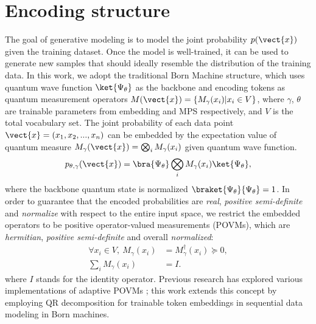 \section{Encoding structure}

The goal of generative modeling is to model the joint probability $p(\vect{x})$ given the training dataset. Once the model is well-trained, it can be used to generate new samples that should ideally resemble the distribution of the training data. In this work, we adopt the traditional Born Machine structure, which uses quantum wave function $\ket{\Psi_\theta}$ as the backbone and encoding tokens as quantum measurement operators $M(\vect{x})=\{M_{\gamma}(x_i)|x_i\in V\}$, where $\gamma$, $\theta$ are trainable parameters from embedding and MPS respectively, and $V$ is the total vocabulary set. The joint probability of each data point $\vect{x}=(x_1,x_2,...,x_n)$ can be embedded by the expectation value of quantum measure $M_\gamma(\vect{x})=\bigotimes_{i}M_{\gamma}(x_i)$ given quantum wave function.
\begin{equation}\label{eq: P}
    p_{\theta, \gamma}(\vect{x})=\bra{\Psi_\theta}\bigotimes_{i}M_{\gamma}(x_i)\ket{\Psi_\theta},
\end{equation}
where the backbone quantum state is normalized $\braket{\Psi_\theta}{\Psi_\theta}=1$. In order to guarantee that the encoded probabilities are \textit{real}, \textit{positive semi-definite} and \textit{normalize} with respect to the entire input space, we restrict the embedded operators to be positive operator-valued measurements (POVMs), which are \textit{hermitian}, \textit{positive semi-definite} and overall \textit{normalized}:
\begin{equation}\label{eq: emb}
\begin{split}
    \forall x_{i}\in V,\ M_{\gamma}(x_i)&=M^{\dagger}_{\gamma}(x_i)\succeq 0,\\
    \sum_{i}M_{\gamma}(x_i)&=I.
\end{split}
\end{equation}
where $I$ stands for the identity operator. Previous research has explored various implementations of adaptive POVMs \cite{2022arXiv220807817G, 2023arXiv230315353Z, 2021PRXQ....2d0342G}; this work extends this concept by employing QR decomposition for trainable token embeddings in sequential data modeling in Born machines.



